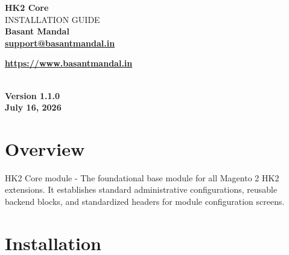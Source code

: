 \documentclass[11pt,a4paper]{article}
\begin{document}
\begin{titlepage}
\centering

\vspace*{4cm}

{\Huge\bfseries HK2 Core}\\[0.6cm]

{\Large INSTALLATION GUIDE}\\[2.5cm]

{\Large \textbf{Basant Mandal}}\\[0.9cm]

\href{mailto:support@basantmandal.in}{\textbf{support@basantmandal.in}}

\vspace{0.3cm}

\href{https://www.basantmandal.in}{\textbf{https://www.basantmandal.in}}

\\[5cm]

{\textbf{Version 1.1.0}}\\[0.3cm]

{\textbf{July 16, 2026}}\\[4cm]

\vfill

\end{titlepage}

\tableofcontents
\newpage

\section{Overview}

HK2 Core module - The foundational base module for all Magento 2 HK2 extensions. It establishes standard administrative configurations, reusable backend blocks, and standardized headers for module configuration screens.

\section{Installation}
\end{document}
